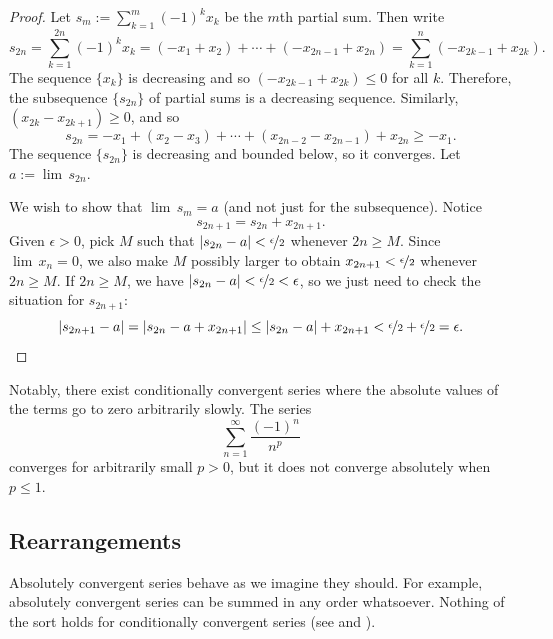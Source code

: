 \begin{proof}
Let $s_m := \sum_{k=1}^m {(-1)}^k x_k$ be the $m$th partial sum.  Then write
\begin{equation*}
s_{2n} =
\sum_{k=1}^{2n} {(-1)}^k x_k
=
(-x_1 + x_2) + \cdots + (-x_{2n-1} + x_{2n})
=
\sum_{k=1}^{n} (-x_{2k-1} + x_{2k}) .
\end{equation*}
The sequence $\{ x_k \}$ is decreasing and so $(-x_{2k-1}+x_{2k}) \leq 0$
for all $k$.
Therefore, the subsequence $\{ s_{2n} \}$ of partial sums
is a decreasing sequence.  Similarly, $(x_{2k}-x_{2k+1}) \geq 0$, and so
\begin{equation*}
s_{2n} = - x_1 + ( x_2 - x_3 ) + \cdots + ( x_{2n-2} - x_{2n-1} ) + x_{2n}
\geq -x_1 .
\end{equation*}
The sequence $\{ s_{2n} \}$ is decreasing and bounded below, so it converges.
Let $a := \lim\, s_{2n}$.

We wish to show that $\lim\, s_m = a$ (and not just for the subsequence).
Notice
\begin{equation*}
s_{2n+1} = s_{2n} + x_{2n+1} .
\end{equation*}
Given $\epsilon > 0$, pick $M$ such that $\left\lvert {s_{2n}-a} \right\rvert <
\nicefrac{\epsilon}{2}$ whenever $2n \geq M$.
Since $\lim\, x_n = 0$, we also
make $M$ possibly larger
to obtain
$x_{2n+1} < \nicefrac{\epsilon}{2}$ whenever $2n \geq M$.  
If $2n \geq M$, we have
$\left\lvert {s_{2n}-a} \right\rvert < \nicefrac{\epsilon}{2} < \epsilon$, so we just need
to check the situation for $s_{2n+1}$:
\begin{equation*}
\left\lvert {s_{2n+1}-a} \right\rvert = 
\left\lvert {s_{2n}-a + x_{2n+1}} \right\rvert \leq
\left\lvert {s_{2n}-a} \right\rvert + x_{2n+1} < 
\nicefrac{\epsilon}{2}+ \nicefrac{\epsilon}{2} = \epsilon .  \qedhere
\end{equation*}
\end{proof}

Notably, there exist conditionally convergent series
where the absolute values of the terms go to zero arbitrarily slowly.
The series
\begin{equation*}
\sum_{n=1}^\infty \frac{{(-1)}^n}{n^p}
\end{equation*}
converges for arbitrarily small $p > 0$, but it does not converge
absolutely when $p \leq 1$.

\subsection{Rearrangements}

Absolutely convergent series behave as we imagine they should.  For example,
absolutely convergent series can be summed in any order whatsoever.  Nothing
of the sort holds for conditionally convergent series
(see 
and ).

